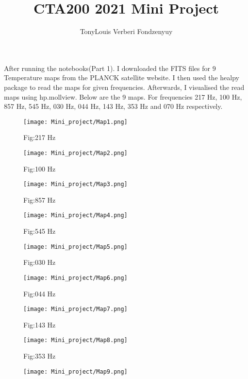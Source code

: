 \documentclass{article}
\title{CTA200 2021 Mini Project}
\author{TonyLouis Verberi Fondzenyuy}
\date{}
\begin{document}
\maketitle

\section{}
After running the notebooks(Part 1). I downloaded the FITS files for 9 Temperature maps from the PLANCK satellite website. I then used the healpy package to read the maps for given frequencies. Afterwards, I visualised the read maps using hp.mollview. Below are the 9 maps. For frequencies 217 Hz, 100 Hz, 857 Hz, 545 Hz, 030 Hz, 044 Hz, 143 Hz, 353 Hz and 070 Hz respectively.

\begin{figure} 
  \texttt{[image: Mini\_project/Map1.png]}
   \caption{Fig:217 Hz }
  \texttt{[image: Mini\_project/Map2.png]}
   \caption{Fig:100 Hz }
\end{figure}

  \newpage
  
\begin{figure}
    \texttt{[image: Mini\_project/Map3.png]}
    \caption{Fig:857 Hz }
    \texttt{[image: Mini\_project/Map4.png]}
    \caption{Fig:545 Hz }
\end{figure}

\newpage


\begin{figure}

    \texttt{[image: Mini\_project/Map5.png]}
    \caption{Fig:030 Hz }
    \texttt{[image: Mini\_project/Map6.png]}
    \caption{Fig:044 Hz }
    
\end{figure}

\newpage
  
\begin{figure}

    \texttt{[image: Mini\_project/Map7.png]}
    \caption{Fig:143 Hz }
    \texttt{[image: Mini\_project/Map8.png]}
    \caption{Fig:353 Hz }
    
\end{figure}


\newpage


\begin{figure}
    \texttt{[image: Mini\_project/Map9.png]}
\end{figure}
  
\end{document}
